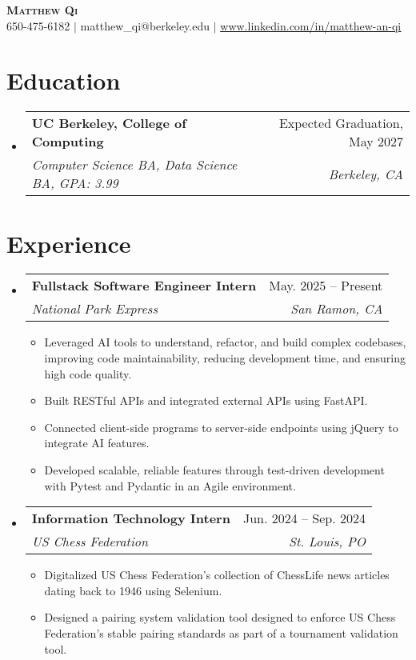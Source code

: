 \documentclass[letterpaper,11pt]{article}
\makeatletter
\newcommand{\resumeItem}[1]{
  \item\small{
    {#1 \vspace{-2pt}}
  }
}
\newcommand{\resumeSubheading}[4]{
  \vspace{-2pt}\item
    \begin{tabular*}{0.97\textwidth}[t]{l@{\extracolsep{\fill}}r}
      \textbf{#1} & #2 \\
      \textit{\small#3} & \textit{\small #4} \\
    \end{tabular*}\vspace{-7pt}
}
\newcommand{\resumeSubSubheading}[2]{
    \item
    \begin{tabular*}{0.97\textwidth}{l@{\extracolsep{\fill}}r}
      \textit{\small#1} & \textit{\small #2} \\
    \end{tabular*}\vspace{-7pt}
}
\newcommand{\resumeSubHeadingListStart}{\begin{itemize}[leftmargin=0.15in, label={}]}
\newcommand{\resumeSubHeadingListEnd}{\end{itemize}}
\newcommand{\resumeItemListStart}{\begin{itemize}}
\newcommand{\resumeItemListEnd}{\end{itemize}\vspace{-5pt}}
\makeatother
\begin{document}
\begin{center}
    \textbf{\Huge \scshape Matthew Qi} \\ \vspace{1pt}
    \small 650-475-6182 $|$ {matthew\_qi@berkeley.edu} $|$ 
    \href{https://www.linkedin.com/in/matthew-an-qi}{\underline{www.linkedin.com/in/matthew-an-qi}} %
\end{center}


\section{Education}
  \resumeSubHeadingListStart
    \resumeSubheading
      {UC Berkeley, College of Computing}{Expected Graduation, May 2027}
    {Computer Science BA, Data Science BA, GPA: 3.99}{Berkeley, CA}
    

  \resumeSubHeadingListEnd
\section{Experience}
  \resumeSubHeadingListStart
  \resumeSubheading
      {Fullstack Software Engineer Intern} {May. 2025 -- Present}
      {National Park Express}{San Ramon, CA}
      \resumeItemListStart
        \resumeItem{Leveraged AI tools to understand, refactor, and build complex codebases, improving code maintainability, reducing development time, and ensuring high code quality.}
        \resumeItem{Built RESTful APIs and integrated external APIs using FastAPI.}
        \resumeItem{Connected client-side programs to server-side endpoints using jQuery to integrate AI features.}
        \resumeItem{Developed scalable, reliable features through test-driven development with Pytest and Pydantic in an Agile environment.}
      \resumeItemListEnd
    \resumeSubheading
      {Information Technology Intern}{Jun. 2024 -- Sep. 2024}
      {US Chess Federation}{St. Louis, PO}
      \resumeItemListStart
        \resumeItem{Digitalized US Chess Federation's collection of ChessLife news articles dating back to 1946 using Selenium.}
        \resumeItem{Designed a pairing system validation tool designed to enforce US Chess Federation's stable pairing standards as part of a tournament validation tool.}
      \resumeItemListEnd
    \resumeSubHeadingListEnd
\end{document}

